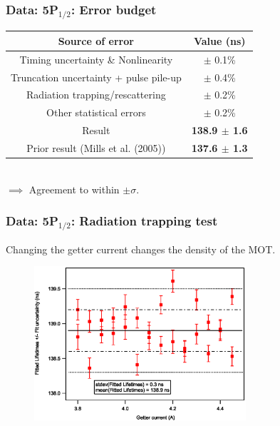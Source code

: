 \documentclass{beamer}
\theoremstyle{definition}
\begin{document}
\begin{frame}
\frametitle{Data: 5P$_{\text{1/2}}$: Error budget}


\begin{table}
	\begin{center}
		\begin{tabular}{|c|c|}
			\hline
			Source of error & Value (ns)\\ \hline
			Timing uncertainty \& Nonlinearity & $\pm$ 0.1\% \\ 
			Truncation uncertainty + pulse pile-up & $\pm$ 0.4\%\\
			Radiation trapping/rescattering & $\pm$ 0.2\% \\
			Other statistical errors &   $\pm$ 0.2\%  \\
			\hline
			Result & \textbf{138.9 $\pm$ 1.6}  \\
			\hline
			Prior result (Mills et al. (2005)) & \textbf{137.6 $\pm$ 1.3}  \\
			\hline
		\end{tabular}
	\end{center}
\end{table}
$\,$\\

$\implies$ Agreement to within $\pm \sigma.$

\end{frame}



\begin{frame}
\frametitle{Data: 5P$_{\text{1/2}}$: Radiation trapping test}



Changing the getter current changes the density of the MOT.


\begin{figure}[!htb]
	\centering
	\includegraphics[width=0.7\textwidth]{getter_currents.eps}
\end{figure}



\end{frame}
\end{document}
